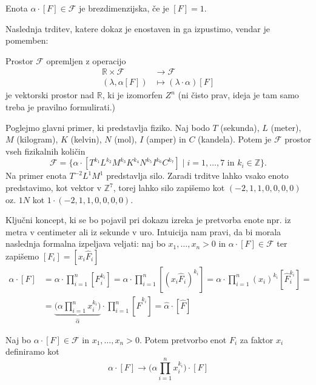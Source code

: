 \documentclass[mat2, tisk]{fmfdelo}
\newcommand{\R}{\mathbb R}
\newcommand{\Z}{\mathbb Z}
\begin{document}
\begin{definicija}
Enota $\alpha\cdot[F] \in \mathcal{F}$ je brezdimenzijska, če je $[F] = 1$.
\end{definicija}

Naslednja trditev, katere dokaz je enostaven in ga izpustimo, vendar je pomemben: 

\begin{trditev}
Prostor $\mathcal{F}$ opremljen z operacijo 
\begin{align*}
\R \times \mathcal{F} &\rightarrow \mathcal{F} \\
(\lambda, \alpha[F]) &\mapsto (\lambda \cdot \alpha)[F]
\end{align*}
je vektorski prostor nad $\R$, ki je izomorfen $Z^n$ (ni čisto prav, ideja je tam samo treba je pravilno formulirati.)
\end{trditev}

\begin{primer}
 Poglejmo glavni primer, ki predstavlja fiziko. Naj bodo 
 $T$ (sekunda), $L$ (meter), $M$ (kilogram), $K$ (kelvin), $N$ (mol), $I$ (amper) in $C$ (kandela).
 Potem je $\mathcal{F}$ prostor vseh fizikalnih količin
 $$
 \mathcal{F} = \{\alpha \cdot [T^{k_1} L^{k_2} M^{k_3} K^{k_4} N^{k_5} I^{k_6} C^{k_7}] \mid i = 1, \dots, 7 \text{ in } k_i \in \Z\}.
 $$
 Na primer enota $T^{-2}L^1M^1$ predstavlja silo. Zaradi trditve lahko 
 vsako enoto predstavimo, kot vektor v $\Z^7$, torej lahko silo zapišemo kot 
 $(-2, 1, 1, 0, 0, 0, 0)$ oz. $1N$ kot $1 \cdot (-2, 1, 1, 0, 0, 0, 0)$.
 \end{primer}

Ključni koncept, ki se bo pojavil pri dokazu izreka je pretvorba enote npr.
iz metra v centimeter ali iz sekunde v uro. Intuicija nam pravi, da 
bi morala naslednja formalna izpeljava veljati: naj bo $x_1, \dots, x_n > 0$ in 
$\alpha\cdot[F]\in \mathcal{F}$ ter zapišemo $[F_i] = [x_i \hat{F}_i]$
\begin{align*}
\alpha \cdot [F] &= \alpha\cdot \prod_{i=1}^n [F_i^{k_i}] = 
\alpha\cdot \prod_{i=1}^n [(x_i\hat{F}_i)^{k_i}] = 
\alpha\cdot \prod_{i=1}^n (x_i)^{k_i} [\hat{F}_i^{k_i}] = \\
&= \underbrace{\Big(\alpha\prod_{i=1}^n x_i^{k_i}\Big)}_{\hat{\alpha}} \cdot \prod_{i=1}^n [\hat{F}^{k_i}] = \hat{\alpha}\cdot [\hat{F}]
\end{align*}

\begin{definicija}
Naj bo $\alpha\cdot [F] \in \mathcal{F}$ in $x_1, \dots, x_n > 0$. Potem 
pretvorbo enot $F_i$ za faktor $x_i$ definiramo kot 
\begin{equation}
 \alpha\cdot [F] \rightarrow \Big(\alpha\prod_{i=1}^n x_i^{k_i}\Big)\cdot [F]
\end{equation}
\end{definicija}
\end{document}

